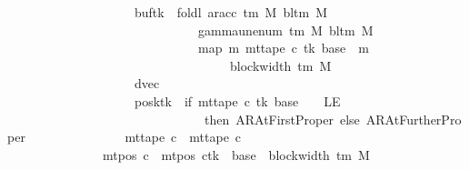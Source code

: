 \begin{isabellebody}
\ \ \ \ \ \ \ \ \ \ \ \ \ \ \ \ \ \ \ \ buf{\isacharparenleft}{\kern0pt}tk\ {\isacharcolon}{\kern0pt}{\isacharequal}{\kern0pt}\ foldl\ {\isacharparenleft}{\kern0pt}ar{\isacharunderscore}{\kern0pt}acc\ {\isacharparenleft}{\kern0pt}{\isasymGamma}{\isacharunderscore}{\kern0pt}tm\ M{\isacharparenright}{\kern0pt}\ {\isacharparenleft}{\kern0pt}bl{\isacharunderscore}{\kern0pt}tm\ M{\isacharparenright}{\kern0pt}{\isacharparenright}{\kern0pt}\isanewline
\ \ \ \ \ \ \ \ \ \ \ \ \ \ \ \ \ \ \ \ \ \ \ \ \ \ \ \ \ \ {\isacharparenleft}{\kern0pt}gamma{\isacharunderscore}{\kern0pt}unenum\ {\isacharparenleft}{\kern0pt}{\isasymGamma}{\isacharunderscore}{\kern0pt}tm\ M{\isacharparenright}{\kern0pt}\ {\isacharparenleft}{\kern0pt}bl{\isacharunderscore}{\kern0pt}tm\ M{\isacharparenright}{\kern0pt}\ {}{\isacharparenright}{\kern0pt}\isanewline
\ \ \ \ \ \ \ \ \ \ \ \ \ \ \ \ \ \ \ \ \ \ \ \ \ \ \ \ \ \ {\isacharparenleft}{\kern0pt}map\ {\isacharparenleft}{\kern0pt}{\isasymlambda}m{\isachardot}{\kern0pt}\ mt{\isacharunderscore}{\kern0pt}tape\ c{\isacharprime}{\kern0pt}\ tk\ {\isacharparenleft}{\kern0pt}base\ {\isacharplus}{\kern0pt}\ m{\isacharparenright}{\kern0pt}{\isacharparenright}{\kern0pt}\isanewline
\ \ \ \ \ \ \ \ \ \ \ \ \ \ \ \ \ \ \ \ \ \ \ \ \ \ \ \ \ \ \ \ \ \ \ {\isacharbrackleft}{\kern0pt}{}{\isachardot}{\kern0pt}{\isachardot}{\kern0pt}{\isacharless}{\kern0pt}block{\isacharunderscore}{\kern0pt}width\ {\isacharparenleft}{\kern0pt}{\isasymGamma}{\isacharunderscore}{\kern0pt}tm\ M{\isacharparenright}{\kern0pt}{\isacharbrackright}{\kern0pt}{\isacharparenright}{\kern0pt}{\isacharparenright}{\kern0pt}{\isacharcomma}{\kern0pt}\isanewline
\ \ \ \ \ \ \ \ \ \ \ \ \ \ \ \ \ \ \ \ dvec{\isacharcomma}{\kern0pt}\isanewline
\ \ \ \ \ \ \ \ \ \ \ \ \ \ \ \ \ \ \ \ posk{\isacharparenleft}{\kern0pt}tk\ {\isacharcolon}{\kern0pt}{\isacharequal}{\kern0pt}\ if\ mt{\isacharunderscore}{\kern0pt}tape\ c{\isacharprime}{\kern0pt}\ tk\ {\isacharparenleft}{\kern0pt}base\ {\isacharminus}{\kern0pt}\ {}{\isacharparenright}{\kern0pt}\ {\isacharequal}{\kern0pt}\ LE{}\isanewline
\ \ \ \ \ \ \ \ \ \ \ \ \ \ \ \ \ \ \ \ \ \ \ \ \ \ \ \ \ \ \ then\ AR{\isacharunderscore}{\kern0pt}AtFirstProper\ else\ AR{\isacharunderscore}{\kern0pt}AtFurtherProper{\isacharparenright}{\kern0pt}{\isacharparenright}{\kern0pt}\isanewline
\ \ \ \ \ \ \ \ \ \ \ \ \ \ {\isasymand}\ mt{\isacharunderscore}{\kern0pt}tape\ c{\isacharprime}{\kern0pt}{\isacharprime}{\kern0pt}\ {\isacharequal}{\kern0pt}\ mt{\isacharunderscore}{\kern0pt}tape\ c{\isacharprime}{\kern0pt}\isanewline
\ \ \ \ \ \ \ \ \ \ \ \ \ \ {\isasymand}\ mt{\isacharunderscore}{\kern0pt}pos\ c{\isacharprime}{\kern0pt}{\isacharprime}{\kern0pt}\ {\isacharequal}{\kern0pt}\ {\isacharparenleft}{\kern0pt}mt{\isacharunderscore}{\kern0pt}pos\ c{\isacharprime}{\kern0pt}{\isacharparenright}{\kern0pt}{\isacharparenleft}{\kern0pt}tk\ {\isacharcolon}{\kern0pt}{\isacharequal}{\kern0pt}\ base\ {\isacharplus}{\kern0pt}\ block{\isacharunderscore}{\kern0pt}width\ {\isacharparenleft}{\kern0pt}{\isasymGamma}{\isacharunderscore}{\kern0pt}tm\ M{\isacharparenright}{\kern0pt}{\isacharparenright}{\kern0pt}{\isachardoublequoteclose}\isanewline

\end{isabellebody}
